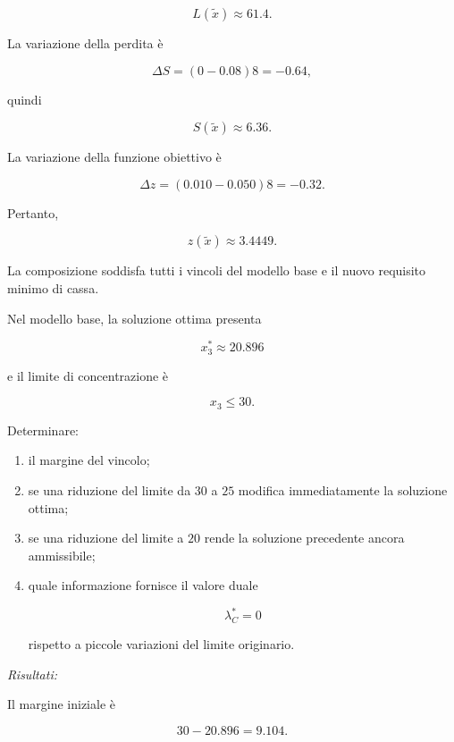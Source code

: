 \[
L(\widetilde x)
\approx
61.4.
\]

La variazione della perdita \`e

\[
\Delta S
=
(0-0.08)8
=
-0.64,
\]

\noindent quindi

\[
S(\widetilde x)
\approx
6.36.
\]

La variazione della funzione obiettivo \`e

\[
\Delta z
=
(0.010-0.050)8
=
-0.32.
\]

Pertanto,

\[
z(\widetilde x)
\approx
3.4449.
\]

La composizione soddisfa tutti i vincoli del modello base e il nuovo
requisito minimo di cassa.


\begin{exercise}

\label{ex:cap11-proposto-concentrazione}

Nel modello base, la soluzione ottima presenta

\[
x_3^*
\approx
20.896
\]

\noindent e il limite di concentrazione \`e

\[
x_3\leq30.
\]

Determinare:

\begin{enumerate}

\item il margine del vincolo;

\item se una riduzione del limite da \(30\) a \(25\) modifica
immediatamente la soluzione ottima;

\item se una riduzione del limite a \(20\) rende la soluzione precedente
ancora ammissibile;

\item quale informazione fornisce il valore duale

\[
\lambda_C^*=0
\]

rispetto a piccole variazioni del limite originario.

\end{enumerate}

\end{exercise}

\noindent
\textit{Risultati:}

Il margine iniziale \`e

\[
30-20.896
=
9.104.
\]

